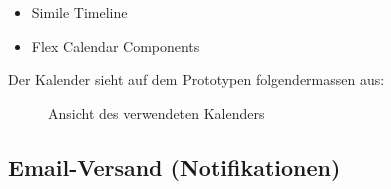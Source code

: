 \begin{itemize}
\item Simile Timeline\cite{simileTimeline}
\item Flex Calendar Components \cite{flexCalendar}
\end{itemize}

Der Kalender sieht auf dem Prototypen folgendermassen aus:
 \begin{figure}[H]
  	\centering
        	\caption{Ansicht des verwendeten Kalenders}
\end{figure}

\subsection{Email-Versand (Notifikationen)}
